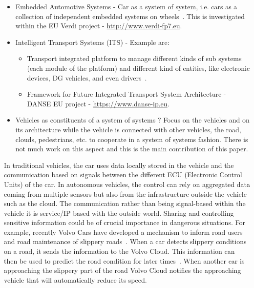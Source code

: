 \begin{itemize}
\item Embedded Automotive Systems - Car as a system of system, i.e. cars as a collection of independent embedded systems on wheels~\cite{Samad2011}. This is investigated within the EU Verdi project - \url{http://www.verdi-fp7.eu}.
\item Intelligent Transport Systems (ITS) - Example are:
		\begin{itemize}
		\item Transport integrated platform to manage different kinds of sub systems (each module of the platform) and different kind of entities, like electronic devices, DG vehicles, and even drivers~\cite{Benza2012}.
		\item Framework for Future Integrated Transport System Architecture - DANSE EU project - \url{https://www.danse-ip.eu}.
		\end{itemize}
\item Vehicles as constituents of a system of systems ? Focus on the vehicles and on its architecture while the vehicle is connected with other vehicles, the road, clouds, pedestrians, etc. to cooperate in a system of systems fashion. There is not much work on this aspect and this is the main contribution of this paper.
\end{itemize}

In traditional vehicles, the car uses data locally stored in the vehicle and the communication
based on signals between the different ECU (Electronic Control Units)
of the car. In autonomous vehicles, the control can rely on aggregated data coming
from multiple sensors but also from the infrastructure outside the vehicle such as
the cloud. The communication rather than being signal-based within the vehicle it is
service/IP based with the outside world. Sharing and controlling sensitive information
could be of crucial importance in dangerous situations. For example, recently
Volvo Cars have developed a mechanism to inform road users and road maintenance
of slippery roads~\cite{Pelliccione2017_SoS}. When a car detects slippery conditions on a road, it sends the
information to the Volvo Cloud. This information can then be used to predict the
road condition for later times~\cite{Panahandeh2017}. When another car is approaching the slippery
part of the road Volvo Cloud notifies the approaching vehicle that will automatically
reduce its speed.




